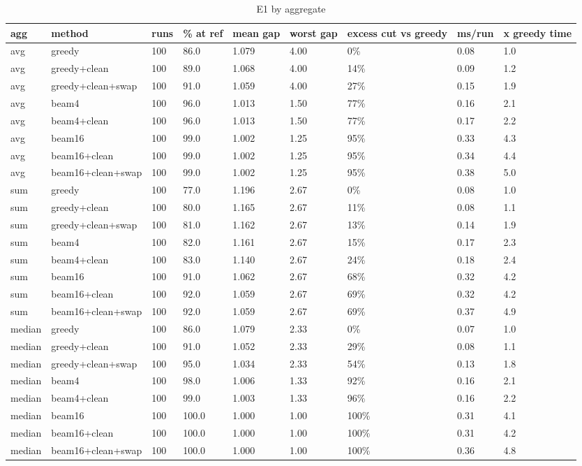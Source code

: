 \begin{table}[t]\centering\small
\caption{E1 by aggregate}
\begin{tabular}{lllllllll}
\toprule
agg & method & runs & \% at ref & mean gap & worst gap & excess cut vs greedy & ms/run & x greedy time \\
\midrule
avg & greedy & 100 & 86.0 & 1.079 & 4.00 & 0\% & 0.08 & 1.0 \\
avg & greedy+clean & 100 & 89.0 & 1.068 & 4.00 & 14\% & 0.09 & 1.2 \\
avg & greedy+clean+swap & 100 & 91.0 & 1.059 & 4.00 & 27\% & 0.15 & 1.9 \\
avg & beam4 & 100 & 96.0 & 1.013 & 1.50 & 77\% & 0.16 & 2.1 \\
avg & beam4+clean & 100 & 96.0 & 1.013 & 1.50 & 77\% & 0.17 & 2.2 \\
avg & beam16 & 100 & 99.0 & 1.002 & 1.25 & 95\% & 0.33 & 4.3 \\
avg & beam16+clean & 100 & 99.0 & 1.002 & 1.25 & 95\% & 0.34 & 4.4 \\
avg & beam16+clean+swap & 100 & 99.0 & 1.002 & 1.25 & 95\% & 0.38 & 5.0 \\
sum & greedy & 100 & 77.0 & 1.196 & 2.67 & 0\% & 0.08 & 1.0 \\
sum & greedy+clean & 100 & 80.0 & 1.165 & 2.67 & 11\% & 0.08 & 1.1 \\
sum & greedy+clean+swap & 100 & 81.0 & 1.162 & 2.67 & 13\% & 0.14 & 1.9 \\
sum & beam4 & 100 & 82.0 & 1.161 & 2.67 & 15\% & 0.17 & 2.3 \\
sum & beam4+clean & 100 & 83.0 & 1.140 & 2.67 & 24\% & 0.18 & 2.4 \\
sum & beam16 & 100 & 91.0 & 1.062 & 2.67 & 68\% & 0.32 & 4.2 \\
sum & beam16+clean & 100 & 92.0 & 1.059 & 2.67 & 69\% & 0.32 & 4.2 \\
sum & beam16+clean+swap & 100 & 92.0 & 1.059 & 2.67 & 69\% & 0.37 & 4.9 \\
median & greedy & 100 & 86.0 & 1.079 & 2.33 & 0\% & 0.07 & 1.0 \\
median & greedy+clean & 100 & 91.0 & 1.052 & 2.33 & 29\% & 0.08 & 1.1 \\
median & greedy+clean+swap & 100 & 95.0 & 1.034 & 2.33 & 54\% & 0.13 & 1.8 \\
median & beam4 & 100 & 98.0 & 1.006 & 1.33 & 92\% & 0.16 & 2.1 \\
median & beam4+clean & 100 & 99.0 & 1.003 & 1.33 & 96\% & 0.16 & 2.2 \\
median & beam16 & 100 & 100.0 & 1.000 & 1.00 & 100\% & 0.31 & 4.1 \\
median & beam16+clean & 100 & 100.0 & 1.000 & 1.00 & 100\% & 0.31 & 4.2 \\
median & beam16+clean+swap & 100 & 100.0 & 1.000 & 1.00 & 100\% & 0.36 & 4.8 \\
\bottomrule
\end{tabular}\end{table}

